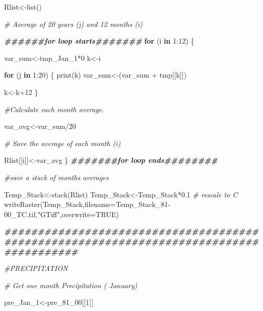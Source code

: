 \documentclass[
  10pt,
  b5paper,
]{book}
\newenvironment{Shaded}{\begin{snugshade}}{\end{snugshade}}
\newcommand{\AttributeTok}[1]{\textcolor[rgb]{0.77,0.63,0.00}{#1}}
\newcommand{\CommentTok}[1]{\textcolor[rgb]{0.56,0.35,0.01}{\textit{#1}}}
\newcommand{\ConstantTok}[1]{\textcolor[rgb]{0.00,0.00,0.00}{#1}}
\newcommand{\ControlFlowTok}[1]{\textcolor[rgb]{0.13,0.29,0.53}{\textbf{#1}}}
\newcommand{\DecValTok}[1]{\textcolor[rgb]{0.00,0.00,0.81}{#1}}
\newcommand{\DocumentationTok}[1]{\textcolor[rgb]{0.56,0.35,0.01}{\textbf{\textit{#1}}}}
\newcommand{\FloatTok}[1]{\textcolor[rgb]{0.00,0.00,0.81}{#1}}
\newcommand{\FunctionTok}[1]{\textcolor[rgb]{0.00,0.00,0.00}{#1}}
\newcommand{\NormalTok}[1]{#1}
\newcommand{\OtherTok}[1]{\textcolor[rgb]{0.56,0.35,0.01}{#1}}
\newcommand{\SpecialCharTok}[1]{\textcolor[rgb]{0.00,0.00,0.00}{#1}}
\newcommand{\StringTok}[1]{\textcolor[rgb]{0.31,0.60,0.02}{#1}}
\begin{document}
\begin{Shaded}
\begin{Highlighting}[]
\NormalTok{Rlist}\OtherTok{\textless{}{-}}\FunctionTok{list}\NormalTok{()}

\CommentTok{\# Average of 20 years (j)  and 12 months (i) }

\DocumentationTok{\#\#\#\#\#\#for loop starts\#\#\#\#\#\#\#}
\ControlFlowTok{for}\NormalTok{ (i }\ControlFlowTok{in} \DecValTok{1}\SpecialCharTok{:}\DecValTok{12}\NormalTok{) \{ }

\NormalTok{var\_sum}\OtherTok{\textless{}{-}}\NormalTok{tmp\_Jan\_1}\SpecialCharTok{*}\DecValTok{0}
\NormalTok{k}\OtherTok{\textless{}{-}}\NormalTok{i}

\ControlFlowTok{for}\NormalTok{ (j }\ControlFlowTok{in} \DecValTok{1}\SpecialCharTok{:}\DecValTok{20}\NormalTok{) \{}
\FunctionTok{print}\NormalTok{(k)}
\NormalTok{var\_sum}\OtherTok{\textless{}{-}}\NormalTok{(var\_sum }\SpecialCharTok{+}\NormalTok{ tmp[[k]])}

\NormalTok{k}\OtherTok{\textless{}{-}}\NormalTok{k}\SpecialCharTok{+}\DecValTok{12}
\NormalTok{\}}

\CommentTok{\#Calculate each month average. }

\NormalTok{var\_avg}\OtherTok{\textless{}{-}}\NormalTok{var\_sum}\SpecialCharTok{/}\DecValTok{20}

\CommentTok{\# Save the average of each month (i)}

\NormalTok{Rlist[[i]]}\OtherTok{\textless{}{-}}\NormalTok{var\_avg}
\NormalTok{\}}
\DocumentationTok{\#\#\#\#\#\#\#for loop ends\#\#\#\#\#\#\#\#}

\CommentTok{\#save a stack of months averages}

\NormalTok{Temp\_Stack}\OtherTok{\textless{}{-}}\FunctionTok{stack}\NormalTok{(Rlist)}
\NormalTok{Temp\_Stack}\OtherTok{\textless{}{-}}\NormalTok{Temp\_Stack}\SpecialCharTok{*}\FloatTok{0.1} \CommentTok{\# rescale to C}
\FunctionTok{writeRaster}\NormalTok{(Temp\_Stack,}\AttributeTok{filename=}\StringTok{\textquotesingle{}Temp\_Stack\_81{-}00\_TC.tif\textquotesingle{}}\NormalTok{,}\StringTok{"GTiff"}\NormalTok{,}\AttributeTok{overwrite=}\ConstantTok{TRUE}\NormalTok{)}

\DocumentationTok{\#\#\#\#\#\#\#\#\#\#\#\#\#\#\#\#\#\#\#\#\#\#\#\#\#\#\#\#\#\#\#\#\#\#\#\#\#\#\#\#\#\#\#\#\#\#\#\#\#\#\#\#\#\#\#\#\#\#\#\#\#\#\#\#\#\#\#\#\#\#\#\#\#\#\#\#\#\#\#\#\#\#\#\#\#\#\#}

\CommentTok{\#PRECIPITATION}

\CommentTok{\# Get one month Precipitation ( January)}

\NormalTok{pre\_Jan\_1}\OtherTok{\textless{}{-}}\NormalTok{pre\_81\_00[[}\DecValTok{1}\NormalTok{]]}


\end{Highlighting}
\end{Shaded}
\end{document}
